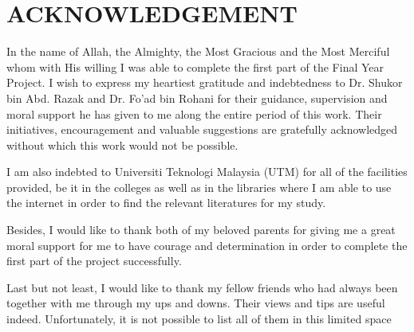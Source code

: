 \documentclass[../index.tex]{subfiles}
\begin{document}
\chapter*{ACKNOWLEDGEMENT}

In the name of Allah, the Almighty, the Most Gracious and the Most Merciful whom with His willing I
was able to complete the first part of the Final Year Project. I wish to express my heartiest
gratitude and indebtedness to Dr. Shukor bin Abd. Razak and Dr. Fo'ad bin Rohani for their guidance,
supervision and moral support he has given to me along the entire period of this work. Their
initiatives, encouragement and valuable suggestions are gratefully acknowledged without which this
work would not be possible.

I am also indebted to Universiti Teknologi Malaysia (UTM) for all of the facilities provided, be it
in the colleges as well as in the libraries where I am able to use the internet in order to find the
relevant literatures for my study.

Besides, I would like to thank both of my beloved parents for giving me a great moral support for me
to have courage and determination in order to complete the first part of the project successfully.

Last but not least, I would like to thank my fellow friends who had always been together with me
through my ups and downs. Their views and tips are useful indeed. Unfortunately, it is not possible
to list all of them in this limited space
\end{document}
